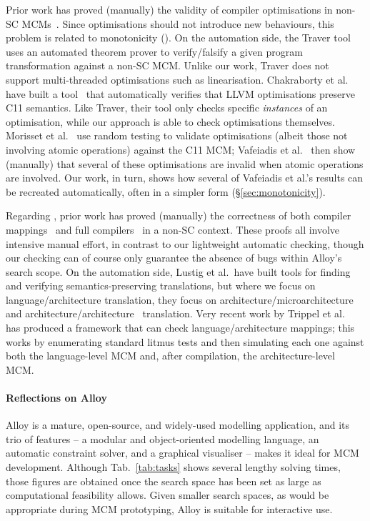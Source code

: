 Prior work has proved (manually) the validity of compiler
optimisations in non-SC MCMs~\cite{sevcik+08, sevcik11}. Since
optimisations should not introduce new behaviours, this problem is
related to monotonicity (). On the automation side, the Traver
tool~\cite{burckhardt+10} uses an automated theorem prover to
verify/falsify a given program transformation against a non-SC
MCM. Unlike our work, Traver does not support multi-threaded
optimisations such as linearisation. Chakraborty et al. have built a
tool~\cite{chakraborty+16} that automatically verifies that LLVM
optimisations preserve C11 semantics. Like Traver, their tool only
checks specific \emph{instances} of an optimisation, while our
approach is able to check optimisations themselves. Morisset et
al.~\cite{morisset+13} use random testing to validate optimisations
(albeit those not involving atomic operations) against the C11 MCM;
Vafeiadis et al.~\cite{vafeiadis+15} then show (manually) that several
of these optimisations are invalid when atomic operations are
involved. Our work, in turn, shows how several of Vafeiadis et al.'s
results can be recreated automatically, often in a simpler form
(\S\ref{sec:monotonicity}).

Regarding , prior work has proved (manually) the correctness of
both compiler mappings~\cite{batty+11, batty+12, wickerson+15a} and
full compilers~\cite{sevcik+11} in a non-SC context. These proofs all
involve intensive manual effort, in contrast to our lightweight
automatic checking, though our checking can of course only guarantee
the absence of bugs within Alloy's search scope. On the automation
side, Lustig et al.\ have built tools for finding and verifying
semantics-preserving translations, but where we focus on
language/architecture translation, they focus on
architecture/microarchitecture~\cite{lustig+14} and
architecture/architecture~\cite{lustig+15} translation. Very recent
work by Trippel et al.~\cite{trippel+16} has produced a framework that
can check language/architecture mappings; this works by enumerating
standard litmus tests and then simulating each one against both the
language-level MCM and, after compilation, the architecture-level MCM.
 
\paragraph{Reflections on Alloy}
Alloy is a mature, open-source, and widely-used modelling application,
and its trio of features -- a modular and object-oriented modelling
language, an automatic constraint solver, and a graphical visualiser
-- makes it ideal for MCM development. Although Tab.~\ref{tab:tasks}
shows several lengthy solving times, those figures are obtained once the
search space has been set as large as computational feasibility
allows. Given smaller search spaces, as would be appropriate during
MCM prototyping, Alloy is suitable for interactive use.

